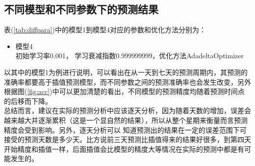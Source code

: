 \subsection{不同模型和不同参数下的预测结果}
表(\ref{tab:diffpara})中的模型1到模型4对应的参数和优化方法分别为：
\begin{itemize}
	\\ 初始学习率为0.1，学习衰减指数0.95，优化方法AdadeltaOptimizer
	 \\初始学习率0.01，学习衰减指数1， 优化方法GradientDescentOptimizer (该优化方法在本模型很容易不收敛)
	\\ 初始学习率0.01， 学习衰减指数0.999，优化方法AdadeltaOptimizer
	\item 模型4 \\初始学习率0.001， 学习衰减指数0.999999999，优化方法AdadeltaOptimizer
\end{itemize}
以其中的模型1为例进行说明，可以看出在从一天到七天的预测周期内，其预测的准确率都要高于插值预测模型，而不同参数之间的预测准确率也会发生改变，另外根据图(\ref{fig:acc})中可以更加清楚的看出，不同模型的预测精度均随着预测时间点的后移而下降。\\
总结而言，建议在实际的预测分析中应该逐天分析，因为随着天数的增加，误差会越来越大并逐渐累积（这是一个显自然的结果），所以从整个星期来衡量而言预测精度会受到影响。另外，逐天分析可以
知道预测出的结果在一定的误差范围下可接受的预测天数是多少天。比方说前三天预测比插值得来的结果好很多，到第四天开始精度和插值一样，后面插值会比模型的精度大等情况在实际的预测中都是有可能发生的。
